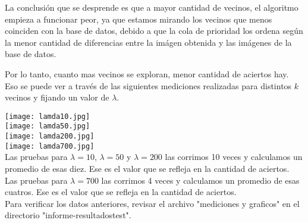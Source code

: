 La conclusión que se desprende es que a mayor cantidad de vecinos, el algoritmo empieza a funcionar peor, ya que estamos mirando los vecinos que menos coinciden con la base de datos, debido a que la cola de prioridad los ordena según la menor cantidad de diferencias entre la imágen obtenida y las imágenes de la base de datos. 

Por lo tanto, cuanto mas vecinos se exploran, menor cantidad de aciertos hay. Eso se puede ver a través de las siguientes mediciones realizadas para distintos $k$ vecinos y fijando un valor de $\lambda$.

\texttt{[image: lamda10.jpg]}\\
\texttt{[image: lamda50.jpg]}\\
\texttt{[image: lamda200.jpg]}\\
\texttt{[image: lamda700.jpg]}\\

Las pruebas para $\lambda = 10$, $\lambda = 50$ y $\lambda = 200$ las corrimos 10 veces y calculamos un promedio de esas diez. Ese es el valor que se refleja en la cantidad de aciertos. \\

Las pruebas para $\lambda = 700$ las corrimos 4 veces y calculamos un promedio de esas cuatros. Ese es el valor que se refleja en la cantidad de aciertos. \\

Para verificar los datos anteriores, revisar el archivo "mediciones y graficos" en el directorio "informe-resultadostest".


